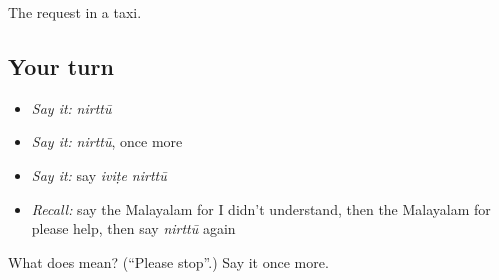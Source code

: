 \begin{grammarlens}[title={What you've built}]
The request in a taxi.
\end{grammarlens}

\subsection*{Your turn}
\begin{itemize}
\raggedright
  \item \emph{Say it:} \emph{nirttū}
  \item \emph{Say it:} \emph{nirttū}, once more
  \item \emph{Say it:} say \emph{iviṭe nirttū}
  \item \emph{Recall:} say the Malayalam for I didn't understand, then the Malayalam for please help, then say \emph{nirttū} again
\end{itemize}

\begin{tcolorbox}[breakable,colback=teal!4,colframe=teal!35!black,title={Before you move on}]
What does  mean? (\textquotedblleft{}Please stop\textquotedblright{}.) Say it once more.
\end{tcolorbox}
